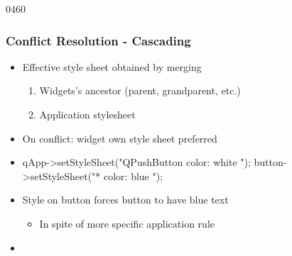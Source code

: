 \begin{slide}[fragile]{0460}\frametitle{Conflict Resolution - Cascading}\label{style_sheet_conflict_resolution}
  \begin{itemize}
  \item Effective style sheet obtained by merging
    \begin{enumerate}
    \item Widgets's ancestor (parent, grandparent, etc.)
    \item Application stylesheet
    \end{enumerate}
  \item On conflict: widget own style sheet preferred
  \item[]
    \begin{cpp}
qApp->setStyleSheet("QPushButton { color: white }");
button->setStyleSheet("* { color: blue }");
    \end{cpp}
  \item Style on button forces button to have blue text
    \begin{itemize}
    \item In spite of more specific application rule
    \end{itemize}
\item[] 
\end{itemize}
\end{slide}

